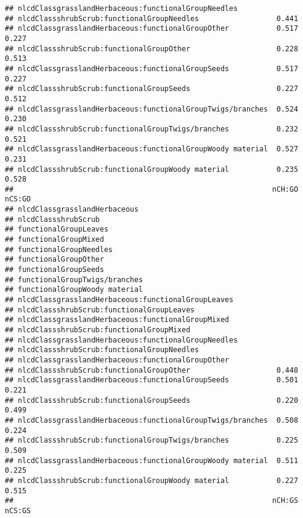 \documentclass[]{article}
\begin{document}
\begin{verbatim}
## nlcdClassgrasslandHerbaceous:functionalGroupNeedles                     
## nlcdClassshrubScrub:functionalGroupNeedles                  0.441       
## nlcdClassgrasslandHerbaceous:functionalGroupOther           0.517  0.227
## nlcdClassshrubScrub:functionalGroupOther                    0.228  0.513
## nlcdClassgrasslandHerbaceous:functionalGroupSeeds           0.517  0.227
## nlcdClassshrubScrub:functionalGroupSeeds                    0.227  0.512
## nlcdClassgrasslandHerbaceous:functionalGroupTwigs/branches  0.524  0.230
## nlcdClassshrubScrub:functionalGroupTwigs/branches           0.232  0.521
## nlcdClassgrasslandHerbaceous:functionalGroupWoody material  0.527  0.231
## nlcdClassshrubScrub:functionalGroupWoody material           0.235  0.528
##                                                            nCH:GO nCS:GO
## nlcdClassgrasslandHerbaceous                                            
## nlcdClassshrubScrub                                                     
## functionalGroupLeaves                                                   
## functionalGroupMixed                                                    
## functionalGroupNeedles                                                  
## functionalGroupOther                                                    
## functionalGroupSeeds                                                    
## functionalGroupTwigs/branches                                           
## functionalGroupWoody material                                           
## nlcdClassgrasslandHerbaceous:functionalGroupLeaves                      
## nlcdClassshrubScrub:functionalGroupLeaves                               
## nlcdClassgrasslandHerbaceous:functionalGroupMixed                       
## nlcdClassshrubScrub:functionalGroupMixed                                
## nlcdClassgrasslandHerbaceous:functionalGroupNeedles                     
## nlcdClassshrubScrub:functionalGroupNeedles                              
## nlcdClassgrasslandHerbaceous:functionalGroupOther                       
## nlcdClassshrubScrub:functionalGroupOther                    0.448       
## nlcdClassgrasslandHerbaceous:functionalGroupSeeds           0.501  0.221
## nlcdClassshrubScrub:functionalGroupSeeds                    0.220  0.499
## nlcdClassgrasslandHerbaceous:functionalGroupTwigs/branches  0.508  0.224
## nlcdClassshrubScrub:functionalGroupTwigs/branches           0.225  0.509
## nlcdClassgrasslandHerbaceous:functionalGroupWoody material  0.511  0.225
## nlcdClassshrubScrub:functionalGroupWoody material           0.227  0.515
##                                                            nCH:GS nCS:GS

\end{verbatim}
\end{document}
